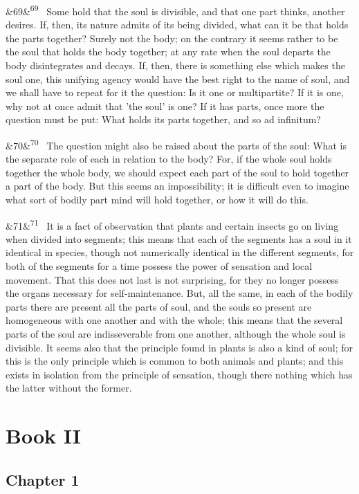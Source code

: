\documentclass[12pt]{article}
\newcommand{\para}[1][]{\par\noindent\ifx&#1&\else\textsuperscript{\footnotesize #1}~\fi}
\begin{document}
\para[69] Some hold that the soul is divisible, and that one part thinks, another desires. If, then, its nature admits of its being divided, what can it be that holds the parts together? Surely not the body; on the contrary it seems rather to be the soul that holds the body together; at any rate when the soul departs the body disintegrates and decays. If, then, there is something else which makes the soul one, this unifying agency would have the best right to the name of soul, and we shall have to repeat for it the question: Is it one or multipartite? If it is one, why not at once admit that 'the soul' is one? If it has parts, once more the question must be put: What holds its parts together, and so ad infinitum?

\para[70] The question might also be raised about the parts of the soul: What is the separate role of each in relation to the body? For, if the whole soul holds together the whole body, we should expect each part of the soul to hold together a part of the body. But this seems an impossibility; it is difficult even to imagine what sort of bodily part mind will hold together, or how it will do this.

\para[71] It is a fact of observation that plants and certain insects go on living when divided into segments; this means that each of the segments has a soul in it identical in species, though not numerically identical in the different segments, for both of the segments for a time possess the power of sensation and local movement. That this does not last is not surprising, for they no longer possess the organs necessary for self-maintenance. But, all the same, in each of the bodily parts there are present all the parts of soul, and the souls so present are homogeneous with one another and with the whole; this means that the several parts of the soul are indisseverable from one another, although the whole soul is divisible. It seems also that the principle found in plants is also a kind of soul; for this is the only principle which is common to both animals and plants; and this exists in isolation from the principle of sensation, though there nothing which has the latter without the former.

\section*{Book II}

\subsection*{Chapter 1}
\end{document}
